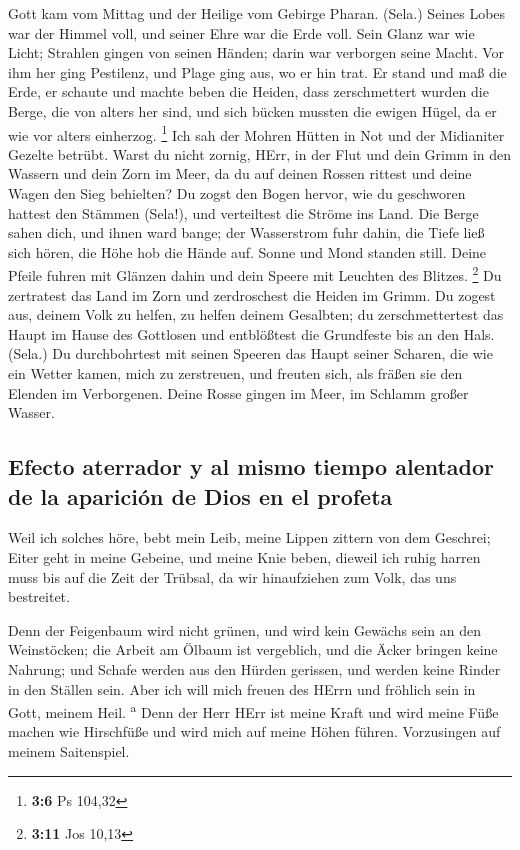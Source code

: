  Gott kam vom Mittag und der Heilige vom Gebirge Pharan.
(Sela.) Seines Lobes war der Himmel voll, und seiner Ehre war die Erde
voll.  Sein Glanz war wie Licht; Strahlen gingen von
seinen Händen; darin war verborgen seine Macht.  Vor ihm
her ging Pestilenz, und Plage ging aus, wo er hin trat. 
Er stand und maß die Erde, er schaute und machte beben die Heiden, dass
zerschmettert wurden die Berge, die von alters her sind, und sich bücken
mussten die ewigen Hügel, da er wie vor alters einherzog. \footnote{\textbf{3:6}
  Ps 104,32}  Ich sah der Mohren Hütten in Not und der
Midianiter Gezelte betrübt.  Warst du nicht zornig, HErr,
in der Flut und dein Grimm in den Wassern und dein Zorn im Meer, da du
auf deinen Rossen rittest und deine Wagen den Sieg behielten?
 Du zogst den Bogen hervor, wie du geschworen hattest den
Stämmen (Sela!), und verteiltest die Ströme ins Land. 
Die Berge sahen dich, und ihnen ward bange; der Wasserstrom fuhr dahin,
die Tiefe ließ sich hören, die Höhe hob die Hände auf. 
Sonne und Mond standen still. Deine Pfeile fuhren mit Glänzen dahin und
dein Speere mit Leuchten des Blitzes. \footnote{\textbf{3:11} Jos 10,13}
 Du zertratest das Land im Zorn und zerdroschest die
Heiden im Grimm.  Du zogest aus, deinem Volk zu helfen,
zu helfen deinem Gesalbten; du zerschmettertest das Haupt im Hause des
Gottlosen und entblößtest die Grundfeste bis an den Hals. (Sela.)
 Du durchbohrtest mit seinen Speeren das Haupt seiner
Scharen, die wie ein Wetter kamen, mich zu zerstreuen, und freuten sich,
als fräßen sie den Elenden im Verborgenen.  Deine Rosse
gingen im Meer, im Schlamm großer Wasser.

\hypertarget{efecto-aterrador-y-al-mismo-tiempo-alentador-de-la-apariciuxf3n-de-dios-en-el-profeta}{%
\subsection{Efecto aterrador y al mismo tiempo alentador de la aparición
de Dios en el
profeta}\label{efecto-aterrador-y-al-mismo-tiempo-alentador-de-la-apariciuxf3n-de-dios-en-el-profeta}}

 Weil ich solches höre, bebt mein Leib, meine Lippen
zittern von dem Geschrei; Eiter geht in meine Gebeine, und meine Knie
beben, dieweil ich ruhig harren muss bis auf die Zeit der Trübsal, da
wir hinaufziehen zum Volk, das uns bestreitet.

 Denn der Feigenbaum wird nicht grünen, und wird kein
Gewächs sein an den Weinstöcken; die Arbeit am Ölbaum ist vergeblich,
und die Äcker bringen keine Nahrung; und Schafe werden aus den Hürden
gerissen, und werden keine Rinder in den Ställen sein. 
Aber ich will mich freuen des HErrn und fröhlich sein in Gott, meinem
Heil. \textsuperscript{a}  Denn der Herr HErr ist meine
Kraft und wird meine Füße machen wie Hirschfüße und wird mich auf meine
Höhen führen. Vorzusingen auf meinem Saitenspiel.
